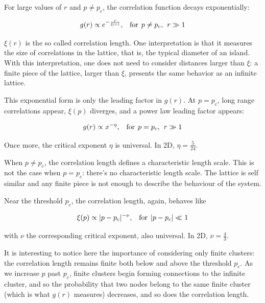 For large values of $r$ and $p \neq p_c$, the correlation function decays exponentially\cite{intro_to_percolation_theory}: 

$$ 
    g(r) \propto e^{-\frac{r}{\xi(r)}} \textrm{,} \hspace{0.35cm}  \textrm{for} \hspace{0.15cm} p \neq p_c, \hspace{0.15cm} r \gg 1 
$$ 

$\xi(r)$ is the so called correlation length. One interpretation is that it measures the size of correlations in the lattice, that is, the typical diameter of an island. With this interpretation, one does not need to consider distances larger than $\xi$: a finite piece of the lattice, larger than $\xi$, presents the same behavior as an infinite lattice. 

This exponential form is only the leading factor in $g(r)$. At $p = p_c$, long range correlations appear, $\xi(p)$ diverges, and a power law leading factor appears:

$$ 
    g(r) \propto x^{-\eta} \textrm{,} \hspace{0.35cm}  \textrm{for} \hspace{0.15cm} p = p_c, \hspace{0.15cm} r \gg 1 
$$ 


Once more, the critical exponent $\eta$ is universal. In 2D, $\eta = \frac{5}{24}$\cite{intro_to_percolation_theory}. 

When $p \neq p_c$, the correlation length defines a characteristic length scale. This is not the case when $p = p_c$: there's no characteristic length scale. The lattice is self similar and any finite piece is not enough to describe the behaviour of the system.

Near the threshold $p_c$, the correlation length, again, behaves like 

$$ 
    \xi(p) \propto  |p - p_c|^{-\nu} \textrm{,} \hspace{0.35cm}  \textrm{for} \hspace{0.15cm} |p - p_c| \ll 1 
$$ 

with $\nu$ the corresponding critical exponent, also universal. In 2D, $\nu = \frac{4}{3}$\cite{intro_to_percolation_theory}.

It is interesting to notice here the importance of considering only finite clusters: the correlation length remains finite both below and above the threshold $p_c$. As we increase $p$ past $p_c$, finite clusters begin forming connections to the infinite cluster, and so the probability that two nodes belong to the same finite cluster (which is what $g(r)$ measures) decreases, and so does the correlation length.  

